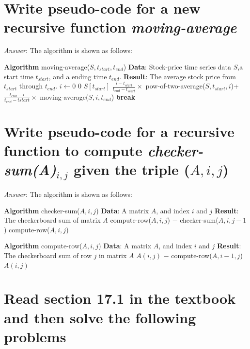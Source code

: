 \documentclass[11pt]{article}
\begin{document}
\section{Write pseudo-code for a new recursive function \emph{moving-average}}
	\emph{Answer}: The algorithm is shown as follows:
	\begin{algorithmic}
	\State \textbf{Algorithm} moving-average($S,t_{start},t_{end}$)
	\State \textbf{Data}: Stock-price time series data $S$,a start time $t_{start}$, and a ending time $t_{end}$.
	\State \textbf{Result}: The average stock price from $t_{start}$ through $t_{end}$.
	\State $i\gets0$
		\State \Return $0$
	\EndIf
		\State \Return ${S[t_{start}]}$
	\EndIf
			\State \Return $\frac{i-t_{start}}{t_{end}-t_{start}}\times$ pow-of-two-average($S,t_{start},i$)+$\frac{t_{end}-i}{t_{end}-t{start}}\times$ moving-average($S,i,t_{end}$)
			\State \textbf{break}
		\EndIf
	\EndFor
	\State {}
	\end{algorithmic}
\section{Write pseudo-code for a recursive function to compute \emph{checker-sum(A)$_{i,j}$} given the triple ($A,i,j$)}
	\emph{Answer}: The algorithm is shown as follows:
	\begin{algorithmic}
	\State \textbf{Algorithm} checker-sum($A,i,j$)
	\State \textbf{Data}: A matrix $A$, and index $i$ and $j$
	\State \textbf{Result}: The checkerboard sum of matrix $A$
	\If {$j>1$}
		\State \Return compute-row($A,i,j$) $-$ checker-sum($A,i,j-1$)
	\Else
		\State \Return compute-row($A,i,j$)
	\EndIf
	\end{algorithmic}

	\begin{algorithmic}
	\State \textbf{Algorithm} compute-row($A,i,j$)
	\State \textbf{Data}: A matrix $A$, and index $i$ and $j$
	\State \textbf{Result}: The checkerboard sum of row $j$ in matrix $A$
	\If {$i>1$}
		\State \Return $A(i,j)$ $-$ compute-row($A,i-1,j$)
	\Else
		\State \Return $A(i,j)$
	\EndIf
	\end{algorithmic}
\section{Read section 17.1 in the textbook and then solve the following problems}
\end{document}
